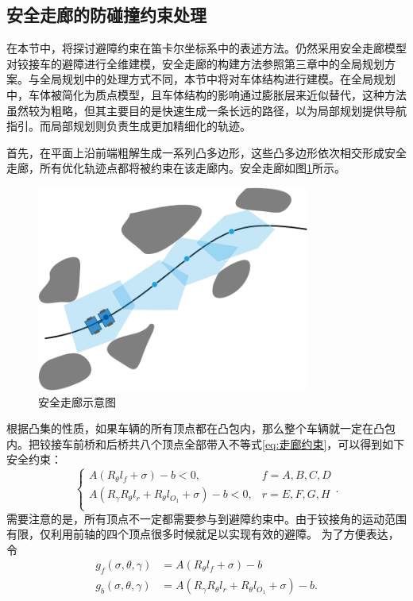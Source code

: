 \documentclass[master,academic]{ysuthesis} %
\begin{document}
		\subsection{安全走廊的防碰撞约束处理}
		在本节中，将探讨避障约束在笛卡尔坐标系中的表述方法。仍然采用安全走廊模型对铰接车的避障进行全维建模，安全走廊的构建方法参照第三章中的全局规划方案。与全局规划中的处理方式不同，本节中将对车体结构进行建模。在全局规划中，车体被简化为质点模型，且车体结构的影响通过膨胀层来近似替代，这种方法虽然较为粗略，但其主要目的是快速生成一条长远的路径，以为局部规划提供导航指引。而局部规划则负责生成更加精细化的轨迹。

		首先，在平面上沿前端粗解生成一系列凸多边形，这些凸多边形依次相交形成安全走廊，所有优化轨迹点都将被约束在该走廊内。安全走廊如图\ref{fig:安全走廊}所示。
		\begin{figure}[!ht]
			\centering
			\includegraphics[width=0.8\textwidth]{安全走廊.png}
			\caption{安全走廊示意图}
			\label{fig:安全走廊}
		\end{figure}
		根据凸集的性质，如果车辆的所有顶点都在凸包内，那么整个车辆就一定在凸包内。把铰接车前桥和后桥共八个顶点全部带入不等式\ref{eq:走廊约束}，可以得到如下安全约束：
		\begin{equation}
			\left\{ \begin{matrix}
				A\left( R_{\theta}l_f+\sigma \right) -b<0,&		f=A,B,C,D\\
				A\left( R_{\gamma}R_{\theta}l_r+R_{\theta}l_{O_1}+\sigma \right) -b<0,&		r=E,F,G,H\\
			\end{matrix} \right. .
		\end{equation}
		需要注意的是，所有顶点不一定都需要参与到避障约束中。由于铰接角的运动范围有限，仅利用前轴的四个顶点很多时候就足以实现有效的避障。
		为了方便表达，令
		\begin{equation}
			\begin{aligned}
			g_f\left( \sigma ,\theta ,\gamma \right) &=A\left( R_{\theta}l_f+\sigma \right) -b\\
			g_b\left( \sigma ,\theta ,\gamma \right) &=A\left( R_{\gamma}R_{\theta}l_r+R_{\theta}l_{O_1}+\sigma \right) -b.
			\end{aligned}
		\end{equation}
\end{document}
